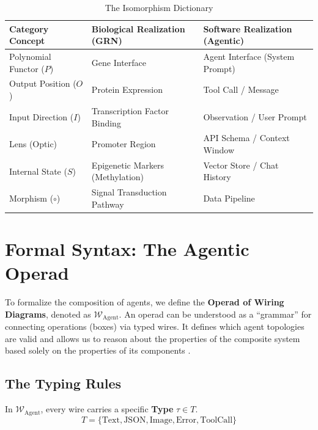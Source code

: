 \documentclass[11pt, a4paper]{article}
\newcommand{\Operad}{\mathcal{W}_{\text{Agent}}}
\begin{document}
\begin{table}[h]
    \centering
    \renewcommand{\arraystretch}{1.5}
    \begin{tabular}{|l|l|l|}
    \hline
    \textbf{Category Concept} & \textbf{Biological Realization (GRN)} & \textbf{Software Realization (Agentic)} \\ \hline
    Polynomial Functor ($P$) & Gene Interface & Agent Interface (System Prompt) \\ \hline
    Output Position ($O$) & Protein Expression & Tool Call / Message \\ \hline
    Input Direction ($I$) & Transcription Factor Binding & Observation / User Prompt \\ \hline
    Lens (Optic) & Promoter Region & API Schema / Context Window \\ \hline
    Internal State ($S$) & Epigenetic Markers (Methylation) & Vector Store / Chat History \\ \hline
    Morphism ($\circ$) & Signal Transduction Pathway & Data Pipeline \\ \hline
    \end{tabular}
    \caption{The Isomorphism Dictionary}
    \label{tab:dictionary}
\end{table}

\section{Formal Syntax: The Agentic Operad}

To formalize the composition of agents, we define the \textbf{Operad of Wiring Diagrams}, denoted as $\Operad$. An operad can be understood as a ``grammar'' for connecting operations (boxes) via typed wires. It defines which agent topologies are valid and allows us to reason about the properties of the composite system based solely on the properties of its components \cite{vagner2015algebras}.

\subsection{The Typing Rules}
In $\Operad$, every wire carries a specific \textbf{Type} $\tau \in T$.
\begin{equation}
    T = \{ \text{Text}, \text{JSON}, \text{Image}, \text{Error}, \text{ToolCall} \}
\end{equation}
\end{document}
